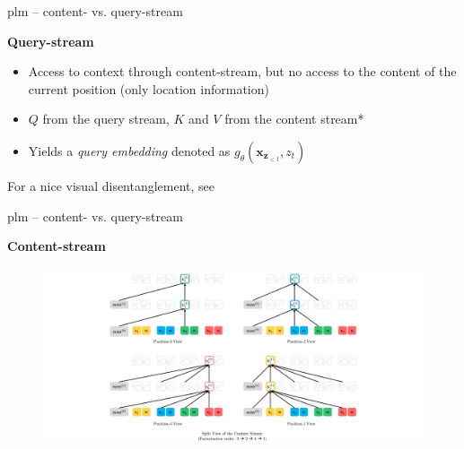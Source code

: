
\begin{frame}{plm -- content- vs. query-stream}

\vfill
	
	\textbf{Query-stream}
	
	\begin{itemize}
		\item Access to context through content-stream, but no access to the content of the current position (only location information)
		\item $Q$ from the query stream, $K$ and $V$ from the content stream*
		\item Yields a \textit{query embedding} denoted as $g_{\theta}(\mathbf{x}_{\mathbf{z}_{< t}}, z_t)$
	\end{itemize}

\vfill

	{\footnotesize *For a nice visual disentanglement, see }
	
\end{frame}


\begin{frame}{plm -- content- vs. query-stream}

\vfill

	\textbf{Content-stream}
	
	\begin{figure}
		\centering
		\hspace{-2cm}\includegraphics[width = 13cm]{figure/61-xlnet-content.png}\\ 
	\end{figure}
	
\vfill

\end{frame}

